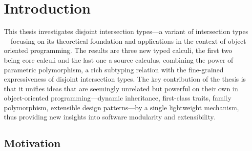 
\chapter{Introduction}




This thesis investigates disjoint intersection types---a variant of intersection
types---focusing on its theoretical foundation and applications in the context
of object-oriented programming. The results are three new typed calculi, the
first two being core calculi and the last one a source calculus, combining the
power of parametric polymorphism, a rich subtyping relation with the
fine-grained expressiveness of disjoint intersection types. The key contribution
of the thesis is that it unifies ideas that are seemingly unrelated but
powerful on their own in object-oriented programming---dynamic inheritance,
first-class traits, family polymorphism, extensible design patterns---by a
single lightweight mechanism, thus providing new insights into software
modularity and extensibility.

\section{Motivation}

